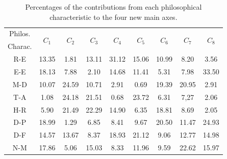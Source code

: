 \documentclass[
 aip,
 jmp,
 amsmath,amssymb,
 reprint,
]{revtex4-1}
\begin{document}
\begin{table}
  \caption{\label{tab:Deviatesphi}Percentages of
    the contributions from each philosophical characteristic to the four 
    new main axes.}
  \begin{tabular}{|c||c|c|c|c|c|c|c|c|}
    \hline
    Philos.      & \multirow{2}{*}{$C_1$} & \multirow{2}{*}{$C_2$} 
    & \multirow{2}{*}{$C_3$} & \multirow{2}{*}{$C_4$} & \multirow{2}{*}{$C_5$} 
    & \multirow{2}{*}{$C_6$} & \multirow{2}{*}{$C_7$} & \multirow{2}{*}{$C_8$}
    \\
    Charac. & & & & & & & & \\
    \hline
    R-E & 13.35   &  1.81 & 13.11 & 31.12 & 15.06 & 10.99 &  8.20 &  3.56 \\
    E-E & 18.13   &  7.88 &  2.10 & 14.68 & 11.41 &  5.31 &  7.98 & 33.50 \\
    M-D & 10.07   & 24.59 & 10.71 &  2.91 &  0.69 & 19.39 & 20.95 &  2.91 \\
    T-A &  1.08   & 24.18 & 21.51 &  0.68 & 23.72 &  6.31 &  7,27 &  2.06 \\
    H-R &  5.90   & 21.49 & 22.29 & 14.90 &  6.35 & 18.81 &  8.69 &  2.05 \\
    D-P & 18.99   &  1.29 &  6.85 &  8.41 &  9.67 & 20.50 & 11.47 & 24.93 \\
    D-F & 14.57   & 13.67 &  8.37 & 18.93 & 21.12 &  9.06 & 12.77 & 14.98 \\
    N-M & 17.86   &  5.06 & 15.03 &  8.33 & 11.96 &  9.59 & 22.62 & 15.97 \\
    \hline
  \end{tabular}
\end{table}
\end{document}
